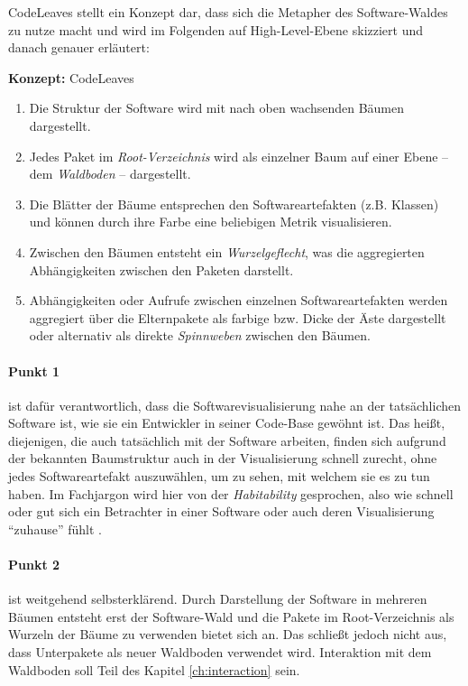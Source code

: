 CodeLeaves stellt ein Konzept dar, dass sich die Metapher des Software-Waldes zu nutze macht und wird im Folgenden auf High-Level-Ebene skizziert und danach genauer erläutert:

\begin{definitionbox}{\textbf{Konzept:} CodeLeaves}
  \begin{enumerate}
    \item Die Struktur der Software wird mit nach oben wachsenden Bäumen dargestellt.
    \item Jedes Paket im \emph{Root-Verzeichnis} wird als einzelner Baum auf einer Ebene -- dem \emph{Waldboden} -- dargestellt.
    \item Die Blätter der Bäume entsprechen den Softwareartefakten (z.B. Klassen) und können durch ihre Farbe eine beliebigen Metrik visualisieren. 
    \item Zwischen den Bäumen entsteht ein \emph{Wurzelgeflecht}, was die aggregierten Abhängigkeiten zwischen den Paketen darstellt.
    \item Abhängigkeiten oder Aufrufe zwischen einzelnen Softwareartefakten werden aggregiert über die Elternpakete als farbige bzw. Dicke der Äste dargestellt oder alternativ als direkte \emph{Spinnweben} zwischen den Bäumen.
  \end{enumerate}
\end{definitionbox}

\paragraph{Punkt 1} ist dafür verantwortlich, dass die Softwarevisualisierung nahe an der tatsächlichen Software ist, wie sie ein Entwickler in seiner Code-Base gewöhnt ist. Das heißt, diejenigen, die auch tatsächlich mit der Software arbeiten, finden sich aufgrund der bekannten Baumstruktur auch in der Visualisierung schnell zurecht, ohne jedes Softwareartefakt auszuwählen, um zu sehen, mit welchem sie es zu tun haben. Im Fachjargon wird hier von der \emph{Habitability} gesprochen, also wie schnell oder gut sich ein Betrachter in einer Software oder auch deren Visualisierung "`zuhause"' fühlt \cite{wettel2007program}.

\paragraph{Punkt 2} ist weitgehend selbsterklärend. Durch Darstellung der Software in mehreren Bäumen entsteht erst der Software-Wald und die Pakete im Root-Verzeichnis als Wurzeln der Bäume zu verwenden bietet sich an. Das schließt jedoch nicht aus, dass Unterpakete als neuer Waldboden verwendet wird. Interaktion mit dem Waldboden soll Teil des Kapitel \ref{ch:interaction} sein.

